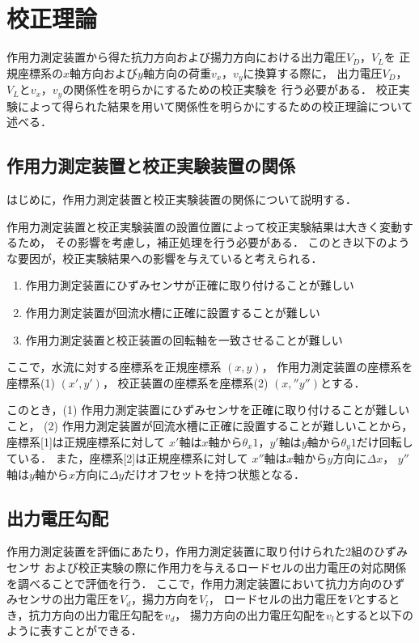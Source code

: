 \section{校正理論}
作用力測定装置から得た抗力方向および揚力方向における出力電圧$V_D$，$V_L$を
正規座標系の$x$軸方向および$y$軸方向の荷重$v_x$，$v_y$に換算する際に，
出力電圧$V_D$，$V_L$と$v_x$，$v_y$の関係性を明らかにするための校正実験を
行う必要がある．
校正実験によって得られた結果を用いて関係性を明らかにするための校正理論について述べる．

\subsection{作用力測定装置と校正実験装置の関係}
はじめに，作用力測定装置と校正実験装置の関係について説明する．

作用力測定装置と校正実験装置の設置位置によって校正実験結果は大きく変動するため，
その影響を考慮し，補正処理を行う必要がある．
このとき以下のような要因が，校正実験結果への影響を与えていると考えられる．

\begin{enumerate}[(1)]
    \item 作用力測定装置にひずみセンサが正確に取り付けることが難しい
    \item 作用力測定装置が回流水槽に正確に設置することが難しい
    \item 作用力測定装置と校正装置の回転軸を一致させることが難しい
\end{enumerate}

ここで，水流に対する座標系を正規座標系 $(x,y)$，
作用力測定装置の座標系を座標系(1) $(x',y')$，
校正装置の座標系を座標系(2) $(x,'' y'')$とする．

このとき，(1) 作用力測定装置にひずみセンサを正確に取り付けることが難しいこと，
(2) 作用力測定装置が回流水槽に正確に設置することが難しいことから，
座標系[1]は正規座標系に対して
$x'$軸は$x$軸から$\theta_x1$，$y'$軸は$y$軸から$\theta_y1$だけ回転している．
また，座標系[2]は正規座標系に対して
$x''$軸は$x$軸から$y$方向に$\Delta x$，
$y''$軸は$y$軸から$x$方向に$\Delta y$だけオフセットを持つ状態となる．

\newpage

\subsection{出力電圧勾配}

作用力測定装置を評価にあたり，作用力測定装置に取り付けられた2組のひずみセンサ
および校正実験の際に作用力を与えるロードセルの出力電圧の対応関係を調べることで評価を行う．
ここで，作用力測定装置において抗力方向のひずみセンサの出力電圧を$V_d$，揚力方向を$V_l$，
ロードセルの出力電圧を$V$とするとき，抗力方向の出力電圧勾配を$v_d$，
揚力方向の出力電圧勾配を$v_l$とすると以下のように表すことができる．

